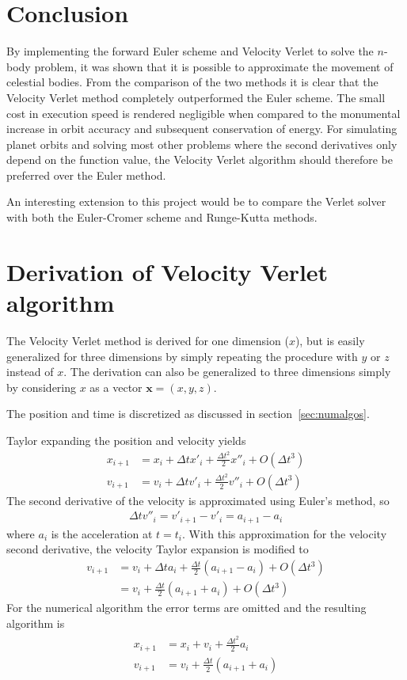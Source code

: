 \documentclass[aps,reprint]{revtex4-1}
\newcommand\blankpage{%
  \null
  \thispagestyle{empty}%
  \addtocounter{page}{-1}%
  \newpage}
\begin{document}
\section{Conclusion}
\label{sec:conclusion}
By implementing the forward Euler scheme and Velocity Verlet to solve the
\(n\)-body problem, it was shown that it is possible to approximate the movement
of celestial bodies. From the comparison of the two methods it is clear that the
Velocity Verlet method completely outperformed the Euler scheme. The small
cost in execution speed is rendered negligible when compared to the monumental
increase in orbit accuracy and subsequent conservation of energy. For simulating planet
orbits and solving most other problems where the second derivatives only depend
on the function value, the Velocity Verlet algorithm should therefore be
preferred over the Euler method.

An interesting extension to this project would be to compare the Verlet solver
with both the Euler-Cromer scheme and Runge-Kutta methods.

\blankpage
\appendix
\section{Derivation of Velocity Verlet algorithm}
\label{sec:velocityverlet}
The Velocity Verlet method is derived for one dimension ($x$), but is easily
generalized for three dimensions by simply repeating the procedure with $y$
or $z$ instead of $x$. The derivation can also be generalized to three dimensions
simply by considering $x$ as a vector $\mathbf{x} = (x, y, z)$.

The position and time is discretized as discussed in section~\ref{sec:numalgos}.

Taylor expanding the position and velocity yields
\begin{align*}
  x_{i+1} &= x_i + \Delta{t} x'_i + \frac{\Delta{t}^2}{2} x''_i + O(\Delta{t}^3) \\
  v_{i+1} &= v_i + \Delta{t} v'_i + \frac{\Delta{t}^2}{2} v''_i + O(\Delta{t}^3)
\end{align*}
The second derivative of the velocity is approximated using Euler's method, so
\begin{align*}
  \Delta{t} v''_i = v'_{i+1} - v'_{i} = a_{i+1} - a_{i}
\end{align*}
where $a_i$ is the acceleration at $t = t_i$. With this approximation for the
velocity second derivative, the velocity Taylor expansion is modified to
\begin{align*}
  v_{i+1} &= v_i + \Delta{t} a_i + \frac{\Delta{t}}{2} (a_{i+1} - a_i) + O(\Delta{t}^3) \\
          &= v_i + \frac{\Delta{t}}{2} (a_{i+1} + a_{i}) + O(\Delta{t}^3)
\end{align*}
For the numerical algorithm the error terms are omitted and the resulting
algorithm is
\begin{align}
  \begin{split}
    x_{i+1} &= x_i + v_i + \frac{\Delta{t}^2}{2} a_i \\
    v_{i+1} &= v_i + \frac{\Delta{t}}{2}(a_{i+1} + a_{i})
  \end{split}
\end{align}
\end{document}
